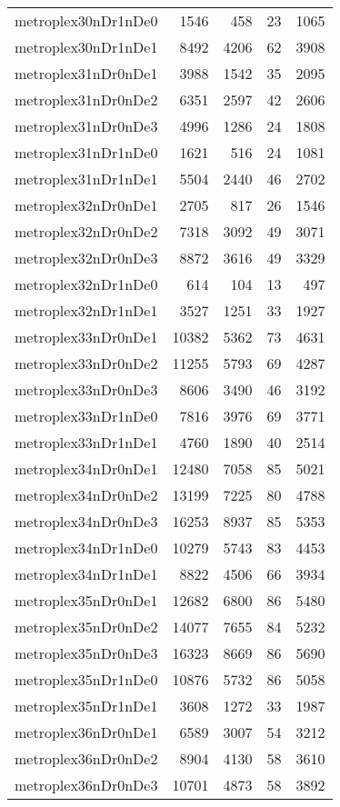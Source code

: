 \begin{longtable}{lrrrr}
metroplex30nDr1nDe0 & 1546 & 458 & 23 & 1065 \\
metroplex30nDr1nDe1 & 8492 & 4206 & 62 & 3908 \\
metroplex31nDr0nDe1 & 3988 & 1542 & 35 & 2095 \\
metroplex31nDr0nDe2 & 6351 & 2597 & 42 & 2606 \\
metroplex31nDr0nDe3 & 4996 & 1286 & 24 & 1808 \\
metroplex31nDr1nDe0 & 1621 & 516 & 24 & 1081 \\
metroplex31nDr1nDe1 & 5504 & 2440 & 46 & 2702 \\
metroplex32nDr0nDe1 & 2705 & 817 & 26 & 1546 \\
metroplex32nDr0nDe2 & 7318 & 3092 & 49 & 3071 \\
metroplex32nDr0nDe3 & 8872 & 3616 & 49 & 3329 \\
metroplex32nDr1nDe0 & 614 & 104 & 13 & 497 \\
metroplex32nDr1nDe1 & 3527 & 1251 & 33 & 1927 \\
metroplex33nDr0nDe1 & 10382 & 5362 & 73 & 4631 \\
metroplex33nDr0nDe2 & 11255 & 5793 & 69 & 4287 \\
metroplex33nDr0nDe3 & 8606 & 3490 & 46 & 3192 \\
metroplex33nDr1nDe0 & 7816 & 3976 & 69 & 3771 \\
metroplex33nDr1nDe1 & 4760 & 1890 & 40 & 2514 \\
metroplex34nDr0nDe1 & 12480 & 7058 & 85 & 5021 \\
metroplex34nDr0nDe2 & 13199 & 7225 & 80 & 4788 \\
metroplex34nDr0nDe3 & 16253 & 8937 & 85 & 5353 \\
metroplex34nDr1nDe0 & 10279 & 5743 & 83 & 4453 \\
metroplex34nDr1nDe1 & 8822 & 4506 & 66 & 3934 \\
metroplex35nDr0nDe1 & 12682 & 6800 & 86 & 5480 \\
metroplex35nDr0nDe2 & 14077 & 7655 & 84 & 5232 \\
metroplex35nDr0nDe3 & 16323 & 8669 & 86 & 5690 \\
metroplex35nDr1nDe0 & 10876 & 5732 & 86 & 5058 \\
metroplex35nDr1nDe1 & 3608 & 1272 & 33 & 1987 \\
metroplex36nDr0nDe1 & 6589 & 3007 & 54 & 3212 \\
metroplex36nDr0nDe2 & 8904 & 4130 & 58 & 3610 \\
metroplex36nDr0nDe3 & 10701 & 4873 & 58 & 3892 \\

\end{longtable}
